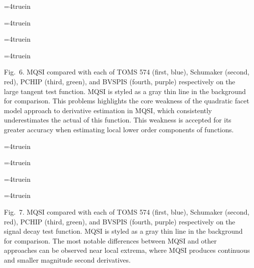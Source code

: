 \topinsert
\centerline{\epsfxsize=4truein }
\centerline{\epsfxsize=4truein }
\centerline{\epsfxsize=4truein }
\centerline{\epsfxsize=4truein }
\beginred
{\narrower\noindent\rmVIII Fig.\ 6.
{\ttVIII MQSI} compared with each of TOMS 574 (first, blue), Schumaker
(second, red), {\ttVIII PCHIP} (third, green), and {\ttVIII BVSPIS}
(fourth, purple) respectively on the {\itVIII large tangent} test
function. {\ttVIII MQSI} is styled as a gray thin line in the
background for comparison. This problems highlights the core weakness
of the quadratic facet model approach to derivative estimation in
{\ttVIII MQSI}, which consistently underestimates the actual
 of this function. This weakness is accepted
for its greater accuracy when estimating local lower order components
of functions.
\par}
\endred
\endinsert

\topinsert
\centerline{\epsfxsize=4truein }
\centerline{\epsfxsize=4truein }
\centerline{\epsfxsize=4truein }
\centerline{\epsfxsize=4truein }
\beginred
{\narrower\noindent\rmVIII Fig.\ 7.
{\ttVIII MQSI} compared with each of TOMS 574 (first, blue), Schumaker
(second, red), {\ttVIII PCHIP} (third, green), and {\ttVIII BVSPIS}
(fourth, purple) respectively on the {\itVIII signal decay} test
function. {\ttVIII MQSI} is styled as a gray thin line in the
background for comparison. The most notable differences between
{\ttVIII MQSI} and other approaches can be observed near local
extrema, where {\ttVIII MQSI} produces continuous and smaller
magnitude second derivatives.
\par}
\endred
\endinsert


